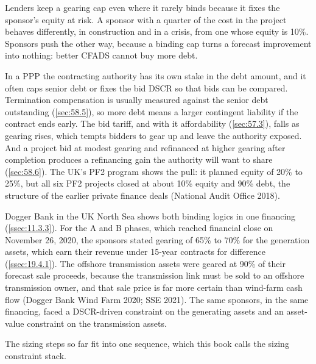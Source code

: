Lenders keep a gearing cap even where it rarely binds because it fixes the sponsor's equity at risk. A sponsor with a quarter of the cost in the project behaves differently, in construction and in a crisis, from one whose equity is 10\%. Sponsors push the other way, because a binding cap turns a forecast improvement into nothing: better CFADS cannot buy more debt.

In a PPP the contracting authority has its own stake in the debt amount, and it often caps senior debt or fixes the bid DSCR so that bids can be compared. Termination compensation is usually measured against the senior debt outstanding (\cref{sec:58.5}), so more debt means a larger contingent liability if the contract ends early. The bid tariff, and with it affordability (\cref{sec:57.3}), falls as gearing rises, which tempts bidders to gear up and leave the authority exposed. And a project bid at modest gearing and refinanced at higher gearing after completion produces a refinancing gain the authority will want to share (\cref{sec:58.6}). The UK's PF2 program shows the pull: it planned equity of 20\% to 25\%, but all six PF2 projects closed at about 10\% equity and 90\% debt, the structure of the earlier private finance deals (National Audit Office 2018).

Dogger Bank in the UK North Sea shows both binding logics in one financing (\cref{ssec:11.3.3}). For the A and B phases, which reached financial close on November 26, 2020, the sponsors stated gearing of 65\% to 70\% for the generation assets, which earn their revenue under 15-year contracts for difference (\cref{ssec:19.4.1}). The offshore transmission assets were geared at 90\% of their forecast sale proceeds, because the transmission link must be sold to an offshore transmission owner, and that sale price is far more certain than wind-farm cash flow (Dogger Bank Wind Farm 2020; SSE 2021). The same sponsors, in the same financing, faced a DSCR-driven constraint on the generating assets and an asset-value constraint on the transmission assets.

The sizing steps so far fit into one sequence, which this book calls the sizing constraint stack.

